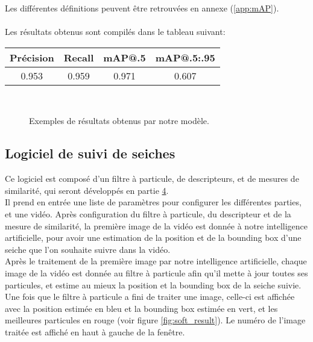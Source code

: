 Les différentes définitions peuvent être retrouvées en annexe (\ref{app:mAP}).\\
\\
Les résultats obtenus sont compilés dans le tableau suivant:\\
\begin{center}
\begin{tabular}{|c|c|c|c|}
	\hline
	Précision & Recall & mAP@.5 & mAP@.5:.95\\
	\hline
	0.953 & 0.959 & 0.971 & 0.607\\
	\hline
\end{tabular}
\end{center}

\begin{figure}[!htbp]
\center
	\hspace{0.1cm}
	\\
	\hspace{0.1cm}
\caption{Exemples de résultats obtenus par notre modèle.}
\label{fig:ai_examples}
\end{figure}
\FloatBarrier



\subsection{Logiciel de suivi de seiches}
Ce logiciel est composé d'un filtre à particule, de descripteurs, et de mesures de similarité, qui seront développés en partie \hyperlink{chapter.4}{4}.\\
Il prend en entrée une liste de paramètres pour configurer les différentes parties, et une vidéo. Après configuration du filtre à particule, du descripteur et de la mesure de similarité, la première image de la vidéo est donnée à notre intelligence artificielle, pour avoir une estimation de la position et de la bounding box d'une seiche que l'on souhaite suivre dans la vidéo.\\
Après le traitement de la première image par notre intelligence artificielle, chaque image de la vidéo est donnée au filtre à particule afin qu'il mette à jour toutes ses particules, et estime au mieux la position et la bounding box de la seiche suivie.\\
Une fois que le filtre à particule a fini de traiter une image, celle-ci est affichée avec la position estimée en bleu et la bounding box estimée en vert, et les meilleures particules en rouge (voir figure \ref{fig:soft_result}). Le numéro de l'image traitée est affiché en haut à gauche de la fenêtre.\\

